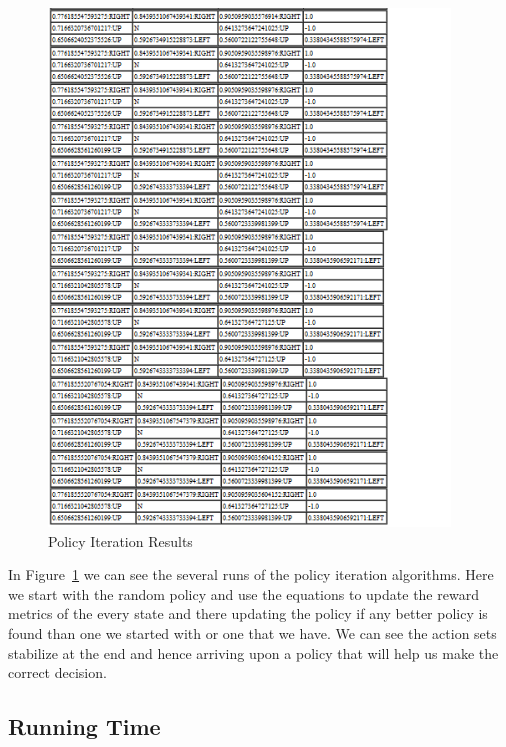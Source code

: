 \begin{figure}[h!]
    \begin{center}
        \includegraphics[width=0.95\textwidth]{Figures/Planning_Figure_4.png}
        \caption{Policy Iteration Results}
        \label{fig:PolicyIterationResults}
    \end{center}
\end{figure}

In Figure~\ref{fig:PolicyIterationResults} we can see the several runs of the policy iteration
algorithms. Here we start with the random policy and use the equations to update
the reward metrics of the every state and there updating the policy if any
better policy is found than one we started with or one that we have. We can see
the action sets stabilize at the end and hence arriving upon a policy that will
help us make the correct decision.

\FloatBarrier

\subsection{Running Time}

